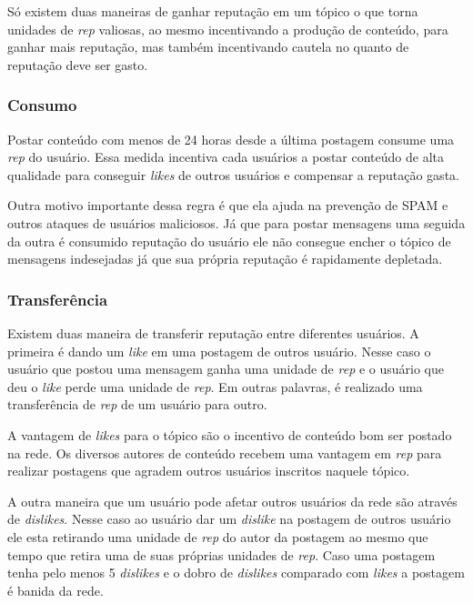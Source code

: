 \documentclass[12pt]{article}
\begin{document}
Só existem duas maneiras de ganhar reputação em um tópico o que torna unidades de \emph{rep} valiosas, ao mesmo incentivando a produção de conteúdo, para ganhar mais reputação, mas também incentivando cautela no quanto de reputação deve ser gasto.  

\subsubsection{Consumo} \label{subsubsec:consumo}

Postar conteúdo com menos de 24 horas desde a última postagem consume uma \emph{rep} do usuário. Essa medida incentiva cada usuários a postar conteúdo de alta qualidade para conseguir \emph{likes} de outros usuários e compensar a reputação gasta.

Outra motivo importante dessa regra é que ela ajuda na prevenção de SPAM e outros ataques de usuários maliciosos. Já que para postar mensagens uma seguida da outra é consumido reputação do usuário ele não consegue encher o tópico de mensagens indesejadas já que sua própria reputação é rapidamente depletada. 

\subsubsection{Transferência} \label{subsubsec:transfe}

Existem duas maneira de transferir reputação entre diferentes usuários. A primeira é dando um \emph{like} em uma postagem de outros usuário. Nesse caso o usuário que postou uma mensagem ganha uma unidade de \emph{rep} e o usuário que deu o \emph{like} perde uma unidade de \emph{rep}. Em outras palavras, é realizado uma transferência de \emph{rep} de um usuário para outro. 

A vantagem de \emph{likes} para o tópico são o incentivo de conteúdo  bom ser postado na rede. Os diversos autores de conteúdo recebem uma vantagem em \emph{rep} para realizar postagens que agradem outros usuários inscritos naquele tópico.

A outra maneira que um usuário pode afetar outros usuários da rede são através de \emph{dislikes}. Nesse caso ao usuário dar um \emph{dislike} na postagem de outros usuário ele esta retirando uma unidade de \emph{rep} do autor da postagem ao mesmo que tempo que retira uma de suas próprias unidades de \emph{rep}. Caso uma postagem tenha pelo menos 5 \emph{dislikes} e o dobro de \emph{dislikes} comparado com \emph{likes} a postagem é banida da rede.  
\end{document}
